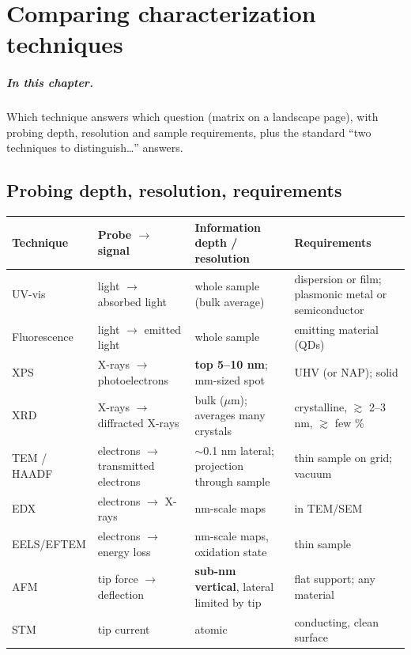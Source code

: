 \chapter{Comparing characterization techniques}
\label{ch:char-compare}

\paragraph{In this chapter.} Which technique answers which question (matrix on a landscape page), with probing depth, resolution and sample
requirements, plus the standard ``two techniques to distinguish\ldots'' answers.



\section{Probing depth, resolution, requirements}
\begin{center}
\small
\renewcommand{\arraystretch}{1.25}
\begin{tabularx}{\linewidth}{@{}lXXX@{}}
\toprule
Technique & Probe $\to$ signal & Information depth / resolution & Requirements \\ \midrule
UV-vis & light $\to$ absorbed light & whole sample (bulk average) & dispersion or film; plasmonic metal or semiconductor \\
Fluorescence & light $\to$ emitted light & whole sample & emitting material (QDs) \\
XPS & X-rays $\to$ photoelectrons & \textbf{top 5--10 nm}; mm-sized spot & UHV (or NAP); solid \\
XRD & X-rays $\to$ diffracted X-rays & bulk ($\mu$m); averages many crystals & crystalline, $\gtrsim$ 2--3 nm, $\gtrsim$ few \% \\
TEM / HAADF & electrons $\to$ transmitted electrons & $\sim$0.1 nm lateral; projection through sample & thin sample on grid; vacuum \\
EDX & electrons $\to$ X-rays & nm-scale maps & in TEM/SEM \\
EELS/EFTEM & electrons $\to$ energy loss & nm-scale maps, oxidation state & thin sample \\
AFM & tip force $\to$ deflection & \textbf{sub-nm vertical}, lateral limited by tip & flat support; any material \\
STM & tip current & atomic & conducting, clean surface \\
\bottomrule
\end{tabularx}
\end{center}

